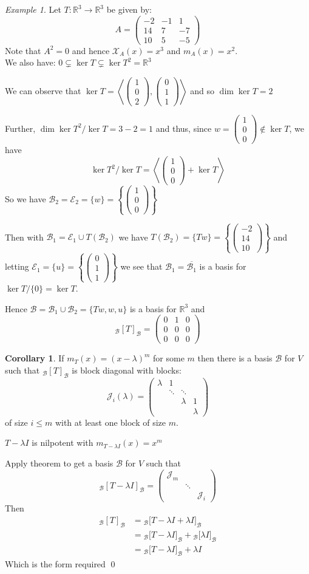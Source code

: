 \documentclass[11pt, a4paper]{report}
\makeatletter
\numberwithin{equation}{section}
\renewcommand{\chi}{\mathcal{X}}
\newcommand{\R}{\mathbb{R}}
\newcommand{\B}{\mathcal{B}}
\newcommand{\spn}[1]{\left\langle #1 \right\rangle}
\newcommand{\nin}{\not\in}
\newcommand{\smp}[1]{\left(\begin{smallmatrix}#1\end{smallmatrix}\right)}
\newcommand{\pmx}[1]{\begin{pmatrix}#1\end{pmatrix}}
\numberwithin{equation}{subsection}
\theoremstyle{plain}
\theoremstyle{definition}
\newtheorem{cor}[thm]{Corollary}
\theoremstyle{remark}
\newtheorem{exmp}{Example}[chapter]
\newtheorem*{prf}{Proof}
\renewenvironment{prf}[1][\proofname]{\par
  \vspace{-\topsep}%
  \normalfont
  \topsep0pt \partopsep0pt %
  \trivlist
  \item[\hskip\labelsep
        \itshape
    #1\@addpunct{.}]\ignorespaces
}{%
  \popQED\endtrivlist\@endpefalse
  \addvspace{6pt plus 6pt} %
}
\newcommand{\pr}[1]{\begin{adjustwidth}{1cm}{} \begin{prf} #1 \end{prf} \end{adjustwidth}}
\makeatother
\begin{document}
\begin{exmp}
Let $T: \R^3 \to \R^3$ be given by:
$$A = \pmx{-2 & -1 & 1 \\ 14 & 7 & -7 \\ 10 & 5 & -5}$$
Note that $A^2 = 0$ and hence $\chi_A(x) = x^3$ and $m_A(x) = x^2$.\\
We also have: $0 \subsetneq \ker T \subsetneq \ker T^2 = \R^3$

We can observe that $\ker T = \spn{\smp{1\\0\\2}, \smp{0\\1\\1}}$ and so $\dim \ker T = 2$

Further, $\dim \ker T^2 / \ker T = 3 - 2 = 1$ and thus, since $w = \smp{1\\0\\0} \nin \ker T$, we have
$$\ker T^2 / \ker T = \spn{ \smp{1\\0\\0} + \ker T} $$
So we have $\B_2 = \mathcal{E}_2 = \{ w \} = \left\{ \smp{1\\0\\0} \right\}$

Then with $\B_1 = \mathcal{E}_1 \cup T(\B_2)$ we have $T(\B_2) = \{ Tw \} = \left\{ \smp{-2\\14\\10} \right\}$ and letting $\mathcal{E}_1 = \{ u \} = \left\{ \smp{0\\1\\1} \right\}$ we see that $\B_1 = \overline{\B_1}$ is a basis for $\ker T / \{0\} = \ker T$.

Hence $\B = \B_1 \cup \B_2 = \{ Tw, w, u \}$ is a basis for $\R^3$ and $$_\B[T]_\B = \pmx{0&1&0\\0&0&0\\0&0&0}$$
\end{exmp}\vfill

\begin{cor}
If $m_T(x) = (x - \lambda)^m$ for some $m$ then there is a basis $\B$ for $V$ such that $_\B[T]_\B$ is block diagonal with blocks:
$$\mathcal{J}_i(\lambda) = \smp{\lambda & 1 & & \\ & \ddots & \ddots & \\ & & \lambda & 1 \\ & & & \lambda}$$
of size $i \leq m$ with at least one block of size $m$.

\pr{
$T - \lambda I$ is nilpotent with $m_{T - \lambda I}(x) = x^m$

Apply theorem to get a basis $\B$ for $V$ such that
$$_\B[T - \lambda I]_\B = \pmx{\mathcal{J}_m \\ & \ddots \\ & & \mathcal{J}_i}$$
Then
\begin{align*}
_\B[T]_\B	&= {_\B[}T - \lambda I + \lambda I]_\B \\
			&= {_\B[}T - \lambda I]_\B + {_\B[}\lambda I]_\B \\
			&= {_\B[}T - \lambda I]_\B + \lambda I
\end{align*}
Which is the form required \qed
}
\end{cor}
\end{document}
